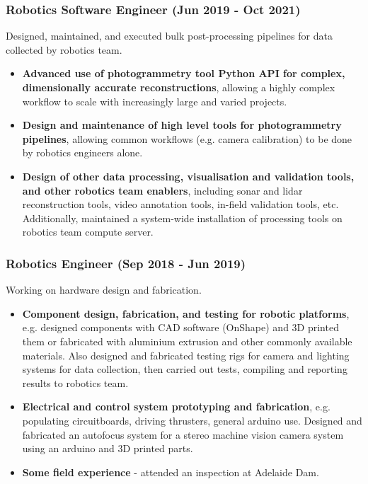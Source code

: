 \documentclass[12pt]{article}
\begin{document}
\begin{FlushLeft}
  \subsubsection{Robotics Software Engineer (Jun 2019 - Oct 2021)}
  Designed, maintained, and executed bulk post-processing pipelines for data collected by robotics team.
  \begin{itemize}
  \item \textbf{Advanced use of photogrammetry tool Python API for complex, dimensionally accurate reconstructions}, allowing a highly complex workflow to scale with increasingly large and varied projects.
  \item \textbf{Design and maintenance of high level tools for photogrammetry pipelines}, allowing common workflows (e.g. camera calibration) to be done by robotics engineers alone.
  \item \textbf{Design of other data processing, visualisation and validation tools, and other robotics team enablers}, including sonar and lidar reconstruction tools, video annotation tools, in-field validation tools, etc. Additionally, maintained a system-wide installation of processing tools on robotics team compute server.
  \end{itemize}
  
  \subsubsection{Robotics Engineer (Sep 2018 - Jun 2019)}
  Working on hardware design and fabrication.
  \begin{itemize}
  \item \textbf{Component design, fabrication, and testing for robotic platforms}, e.g. designed components with CAD software (OnShape) and 3D printed them or fabricated with aluminium extrusion and other commonly available materials. Also designed and fabricated testing rigs for camera and lighting systems for data collection, then carried out tests, compiling and reporting results to robotics team.
  \item \textbf{Electrical and control system prototyping and fabrication}, e.g. populating circuitboards, driving thrusters, general arduino use. Designed and fabricated an autofocus system for a stereo machine vision camera system using an arduino and 3D printed parts.
  \item \textbf{Some field experience} - attended an inspection at Adelaide Dam.
  \end{itemize}


\end{FlushLeft}
\end{document}
